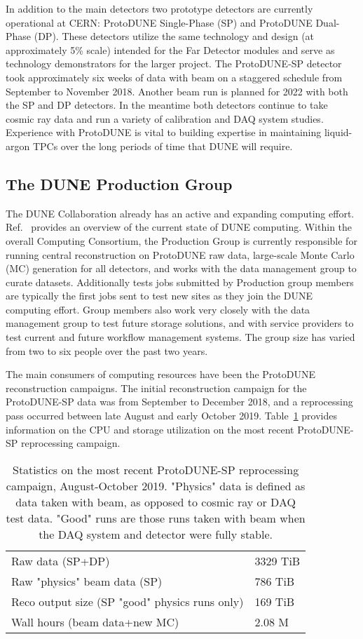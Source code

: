 \documentclass{webofc}
\begin{document}
In addition to the main detectors two prototype detectors are currently operational at CERN: ProtoDUNE Single-Phase (SP) and ProtoDUNE Dual-Phase (DP). These detectors
utilize the same technology and design (at approximately 5\% scale) intended for the Far Detector modules and serve as technology demonstrators for the larger project. The ProtoDUNE-SP detector took  approximately six weeks of data
with beam on a staggered schedule from September to 
November 2018.
Another beam run is planned for 2022 with both the SP and DP detectors. In the meantime both detectors continue to take cosmic ray data and run a variety of
calibration and DAQ system studies. Experience with ProtoDUNE is vital to building expertise in maintaining liquid-argon TPCs over the long periods of time that DUNE will require.
 
\subsection{The DUNE Production Group}
The DUNE Collaboration already has an active and expanding computing effort. Ref.~\cite{heidi} provides an overview of the current state of DUNE computing. Within the overall Computing Consortium, the Production Group
is currently responsible for running central reconstruction on ProtoDUNE raw data, large-scale Monte Carlo (MC) generation for all detectors, and works with the data management group to curate datasets. Additionally tests jobs submitted by Production group members are typically the first jobs sent to test new sites as they join the DUNE computing effort. Group members also work very closely with the data management group to test future storage solutions, and with service providers to test current and future workflow management systems. The group size has varied from two to six people over the past two years.

The main consumers of computing resources have been the ProtoDUNE reconstruction campaigns. The initial reconstruction campaign for the ProtoDUNE-SP data was from September to December 2018, and a reprocessing pass
occurred between late August and early October 2019. Table~\ref{tab:reproc} provides information on the CPU and storage utilization on the most recent ProtoDUNE-SP reprocessing campaign.

\begin{table}[htb]
\centering
\begin{tabular}{ll}
\hline
Raw data (SP+DP) & 3329 TiB \\
Raw "physics" beam data  (SP)& 786 TiB \\
Reco output size (SP "good" physics runs only) & 169 TiB \\
Wall hours (beam data+new MC) & 2.08 M\\
\end{tabular}
\caption{Statistics on the most recent ProtoDUNE-SP reprocessing campaign, August-October 2019. "Physics" data is defined as data taken with beam, as opposed to cosmic ray or DAQ test data. "Good" runs are those runs taken with beam when the DAQ system and detector were fully stable.\label{tab:reproc}}
\end{table}
\end{document}
